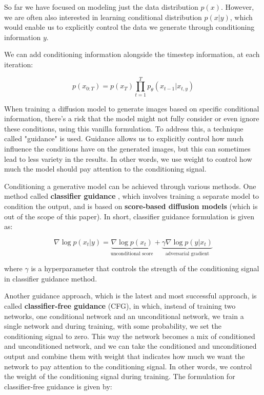 So far we have focused on modeling just the data distribution $p(x)$. However, we are often also interested in learning conditional distribution $p(x|y)$, which would enable us to explicitly control the data we generate through conditioning information $y$.

We can add conditioning information alongside the timestep information, at each iteration:

\[
p(x_{0:T}) = p(x_T) \prod_{t=1}^{T} p_\theta (x_{t-1} | x_{t, y})
\]

When training a diffusion model to generate images based on specific conditional information, there's a risk that the model might not fully consider or even ignore these conditions, using this vanilla formulation. To address this, a technique called "guidance" is used. Guidance allows us to explicitly control how much influence the conditions have on the generated images, but this can sometimes lead to less variety in the results. In other words, we use weight to control how much the model should pay attention to the conditioning signal.

Conditioning a generative model can be achieved through various methods. One method called \textbf{classifier guidance} \cite{openai_diffusion_beats_gans} \cite{score_based_generative_modeling} \cite{openai_diffusion_beats_gans}, which involves training a separate model to condition the output, and is based on \textbf{score-based diffusion models} \cite{score_based_generative_modeling} (which is out of the scope of this paper). In short, classifier guidance formulation is given as:

\[
\nabla \log p(x_t | y) = \underbrace{\nabla \log p(x_t)}_{\text{unconditional score}} + \underbrace{\gamma \nabla \log p(y | x_t)}_{\text{adversarial gradient}}
\]

where $\gamma$ is a hyperparameter that controls the strength of the conditioning signal in classifier guidance method.

Another guidance approach, which is the latest and most successful approach, is called \textbf{classifier-free guidance} \cite{classifier_free_guidance} (CFG), in which, instead of training two networks, one conditional network and an unconditional network, we train a single network and during training, with some probability, we set the conditioning signal to zero. This way the network becomes a mix of conditioned and unconditioned network, and we can take the conditioned and unconditioned output and combine them with weight that indicates how much we want the network to pay attention to the conditioning signal. In other words, we control the weight of the conditioning signal during training. The formulation for classifier-free guidance is given by:


